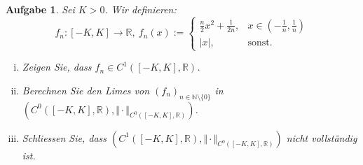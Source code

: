 \documentclass[a4paper, 20]{exam}
\newtheorem{ex}{Aufgabe}
\newcommand\RR{\mathbb{R}}
\newcommand\NN{\mathbb{N}}
\begin{document}
\begin{ex}
Sei $K>0$. Wir definieren:
$$ f_n: [-K, K] \longrightarrow \RR, \
f_n(x):= 
\left\{\begin{array}{lr} \frac{n}{2}x^2 + \frac{1}{2n} , & x \in (-\frac{1}{n}, \frac{1}{n}) \\
\vert x \vert,  & \text{sonst}. \end{array}\right. $$
\begin{enumerate}[i.)]
\item
Zeigen Sie, dass $f_n \in C^1([-K,K], \RR)$.
\item
Berechnen Sie den Limes von $(f_n)_{n \in \NN \setminus \{0\}}$ in $(C^0([-K,K], \RR), \Vert \cdot \Vert_{C^0([-K,K], \RR)})$.
\item
Schliessen Sie, dass $(C^1([-K,K], \RR), \Vert \cdot \Vert_{C^0([-K,K], \RR)})$ nicht vollst\"andig ist.
\end{enumerate}
\end{ex}
\end{document}
